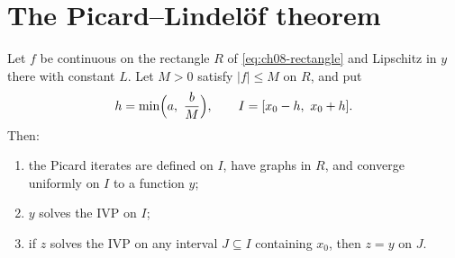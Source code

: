 \section{The Picard--Lindel\"of theorem}\label{sec:ch08-pl}

\begin{theorem}\label{thm:ch08-pl}
Let $f$ be continuous on the rectangle $R$ of \eqref{eq:ch08-rectangle} and
Lipschitz in $y$ there with constant $L$. Let $M>0$ satisfy $|f|\le M$ on $R$,
and put
\[
  h = \min\Bigl(a,\ \frac{b}{M}\Bigr),\qquad I = [x_0 - h,\ x_0 + h].
\]
Then:
\begin{enumerate}[label=(\alph*)]
  \item the Picard iterates are defined on $I$, have graphs in $R$, and
        converge uniformly on $I$ to a function $y$;
  \item $y$ solves the IVP on $I$;
  \item if $z$ solves the IVP on any interval $J\subseteq I$ containing $x_0$,
        then $z = y$ on $J$.
\end{enumerate}
\end{theorem}

